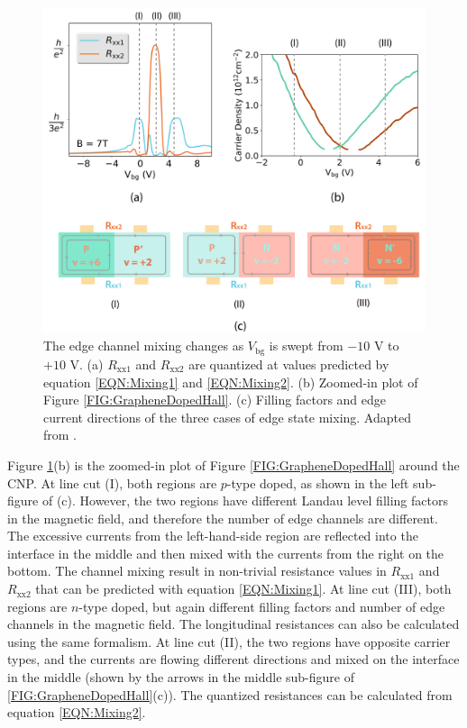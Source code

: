 \documentclass[pdflatex, sectionletters, 12pt, final, phd]{pittetd}    %
\begin{document}
\begin{figure}[p]
	\centering
	\includegraphics[width=1.0\textwidth]{Drawing/EdgeChannels.pdf}
	\caption[The edge channel mixing changes as $V_\mathrm{bg}$ is swept from $-10$ V to $+10$ V]{The edge channel mixing changes as $V_\mathrm{bg}$ is swept from $-10$ V to $+10$ V. (a) $R_\mathrm{xx1}$ and $R_\mathrm{xx2}$ are quantized at values predicted by equation \ref{EQN:Mixing1} and \ref{EQN:Mixing2}. (b) Zoomed-in plot of Figure \ref{FIG:GrapheneDopedHall}. (c) Filling factors and edge current directions of the three cases of edge state mixing. Adapted from \cite{li2019reconfigurable}.}
	\label{FIG:EdgeChannels}
\end{figure}

Figure \ref{FIG:EdgeChannels}(b) is the zoomed-in plot of Figure \ref{FIG:GrapheneDopedHall} around the CNP. At line cut (I), both regions are $p$-type doped, as shown in the left sub-figure of (c). However, the two regions have different Landau level filling factors in the magnetic field, and therefore the number of edge channels are different. The excessive currents from the left-hand-side region are reflected into the interface in the middle and then mixed with the currents from the right on the bottom. The channel mixing result in non-trivial resistance values in $R_\mathrm{xx1}$ and $R_\mathrm{xx2}$ that can be predicted with equation \ref{EQN:Mixing1}. At line cut (III), both regions are $n$-type doped, but again different filling factors and number of edge channels in the magnetic field. The longitudinal resistances can also be calculated using the same formalism. At line cut (II), the two regions have opposite carrier types, and the currents are flowing different directions and mixed on the interface in the middle (shown by the arrows in the middle sub-figure of \ref{FIG:GrapheneDopedHall}(c)). The quantized resistances can be calculated from equation \ref{EQN:Mixing2}.
\end{document}
